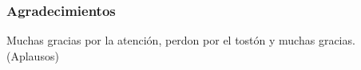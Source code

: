 \begin{frame}
  \frametitle{Agradecimientos}
  \centering
  Muchas gracias por la atención, perdon por el tostón y muchas gracias.\\

  (Aplausos)
\end{frame}

